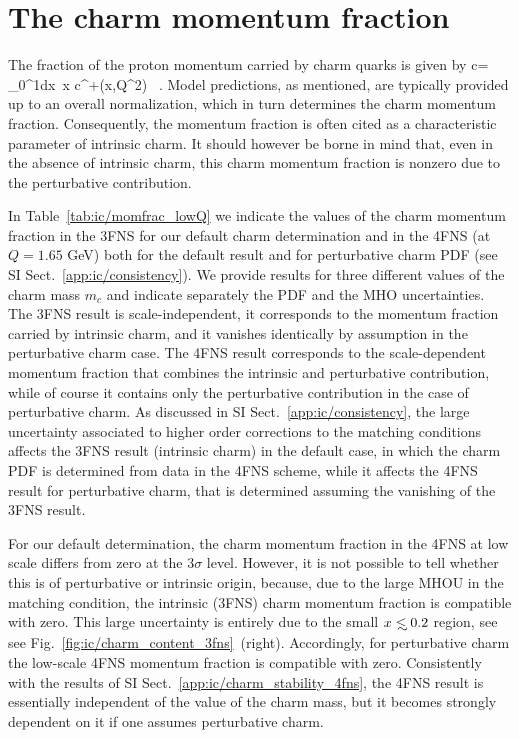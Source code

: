 \clearpage
\section{The charm momentum fraction}
\label{app:ic/charm_mom_frac}

The fraction of the proton momentum carried by charm quarks
is given by
\be
\label{eq:ic/charm_momentum_fraction}
\lc c\rc = \int_0^1dx\, x c^+(x,Q^2) \, .
\ee
Model predictions, as mentioned, are typically provided up to an
overall normalization, which in turn determines the charm momentum fraction.
%
Consequently, the momentum fraction is often cited as a characteristic
parameter of intrinsic charm.
%
It should however be borne in mind that,
even in the absence of intrinsic charm, this charm momentum fraction is nonzero due
to the perturbative contribution.

In Table~\ref{tab:ic/momfrac_lowQ} we indicate
the values of the charm momentum fraction
 in the 3FNS for our default charm
  determination and in the 4FNS  (at $Q=1.65$ GeV) both for the
  default result and for perturbative charm PDF (see SI Sect.~\ref{app:ic/consistency}).
%
We provide results for  three different values of the charm mass $m_c$ and
indicate separately the PDF and the MHO uncertainties.
%
The 3FNS result is scale-independent, it corresponds to the
momentum fraction carried by intrinsic charm, and it vanishes identically
by assumption in the perturbative charm case.
%
The 4FNS result corresponds to
the scale-dependent momentum fraction that combines the intrinsic and
perturbative contribution, while of course it contains only the
perturbative contribution in the case of perturbative charm.
%
As
discussed in SI Sect.~\ref{app:ic/consistency}, the large uncertainty
associated to higher order corrections to the matching conditions
affects the 3FNS result (intrinsic charm) in the default case, in
which the charm PDF is determined from data in the 4FNS scheme, while
it affects the 4FNS result for perturbative charm, that is determined
assuming the vanishing of the 3FNS result.

 For our default determination, the charm
momentum fraction in the 4FNS at low scale
differs from zero at the $3\sigma$
level.
%
However, it is not possible to tell whether this is of
perturbative or intrinsic origin, because, due to  the large MHOU in
the matching condition, the intrinsic (3FNS) charm momentum fraction
is compatible with zero. This large uncertainty is entirely due to the
small $x\lsim 0.2$ region, see see
Fig.~\ref{fig:ic/charm_content_3fns}~(right).
%
Accordingly, for perturbative charm the
low-scale 4FNS
momentum fraction is compatible with zero.
%
Consistently with the results of SI Sect.~\ref{app:ic/charm_stability_4fns},
the 4FNS result is essentially independent of the value of the charm
mass, but it becomes strongly dependent on it if one assumes
perturbative charm.

